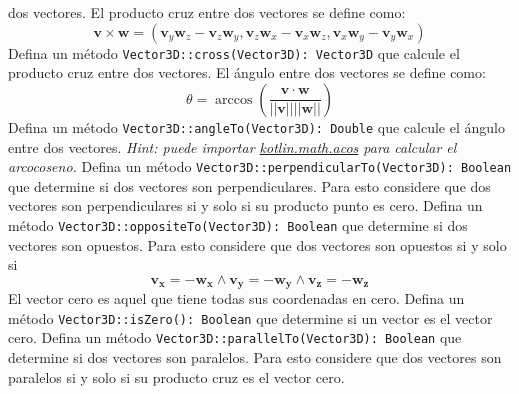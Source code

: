 \begin{Exercise}[title={Algebra Vectorial}]
      dos vectores.
    \Question El producto cruz entre dos vectores se define como:
      \[
        \mathbf{v} \times \mathbf{w} = 
          (\mathbf{v}_y \mathbf{w}_z - \mathbf{v}_z \mathbf{w}_y, 
           \mathbf{v}_z \mathbf{w}_x - \mathbf{v}_x \mathbf{w}_z, 
           \mathbf{v}_x \mathbf{w}_y - \mathbf{v}_y \mathbf{w}_x)
      \]
      Defina un método \texttt{Vector3D::cross(Vector3D): Vector3D} que calcule el producto cruz 
      entre dos vectores.
    \Question El ángulo entre dos vectores se define como:
      \[
        \theta = \arccos{\left(\frac{\mathbf{v} \cdot \mathbf{w}}{||\mathbf{v}|| ||\mathbf{w}||}\right)}
      \]
      Defina un método \texttt{Vector3D::angleTo(Vector3D): Double} que calcule el ángulo entre dos 
      vectores.
      \textit{Hint: puede importar \url{kotlin.math.acos} para calcular el arcocoseno.}
    \Question Defina un método \texttt{Vector3D::perpendicularTo(Vector3D): Boolean} que determine si dos 
      vectores son perpendiculares.
      Para esto considere que dos vectores son perpendiculares si y solo si su producto punto es 
      cero.
    \Question Defina un método \texttt{Vector3D::oppositeTo(Vector3D): Boolean} que determine si dos 
      vectores son opuestos.
      Para esto considere que dos vectores son opuestos si y solo si
      \[
        \mathbf{v_x} = -\mathbf{w_x} \wedge \mathbf{v_y} = -\mathbf{w_y} \wedge 
          \mathbf{v_z} = -\mathbf{w_z}
      \]
    \Question El vector cero es aquel que tiene todas sus coordenadas en cero.
      Defina un método \texttt{Vector3D::isZero(): Boolean} que determine si un vector es el vector 
      cero.
    \Question Defina un método \texttt{Vector3D::parallelTo(Vector3D): Boolean} que determine si dos 
      vectores son paralelos.
      Para esto considere que dos vectores son paralelos si y solo si su producto cruz es el vector 
      cero.
  \end{Exercise} 